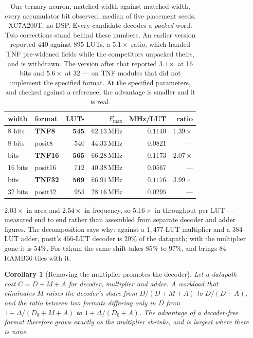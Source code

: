 \documentclass[11pt]{article}
\newtheorem{corollary}{Corollary}
\theoremstyle{definition}
\begin{document}
\begin{table}[t]\centering
\caption{One ternary neuron, matched width against matched width, every
accumulator bit observed, median of five placement seeds, XC7A200T, no DSP.
Every candidate decodes a \emph{packed} word. Two corrections stand behind these
numbers. An earlier version reported $440$ against $895$ LUTs, a $5.1\times$
ratio, which handed TNF pre-widened fields while the competitors unpacked
theirs, and is withdrawn. The version after that reported $3.1\times$ at 16 bits
and $5.6\times$ at 32 --- on TNF modules that did not implement the specified
format. At the specified parameters, and checked against a reference, the
advantage is smaller and it is real.}
\label{tab:tnet}
\begin{tabular}{llrrrr}
\toprule
width & format & LUTs & $F_{\max}$ & MHz/LUT & ratio \\
\midrule
8 bits & \textbf{TNF8} & $\mathbf{545}$ & $62.13$\,MHz & $\mathbf{0.1140}$ & $\mathbf{1.39\times}$ \\
8 bits & posit8 & $540$ & $44.33$\,MHz & $0.0821$ & --- \\
\addlinespace
16 bits & \textbf{TNF16} & $\mathbf{565}$ & $66.28$\,MHz & $\mathbf{0.1173}$ & $\mathbf{2.07\times}$ \\
16 bits & posit16 & $712$ & $40.38$\,MHz & $0.0567$ & --- \\
\addlinespace
32 bits & \textbf{TNF32} & $\mathbf{569}$ & $66.91$\,MHz & $\mathbf{0.1176}$ & $\mathbf{3.99\times}$ \\
32 bits & posit32 & $953$ & $28.16$\,MHz & $0.0295$ & --- \\
\bottomrule
\end{tabular}
\end{table}

$2.03\times$ in area and $2.54\times$ in frequency, so $5.16\times$ in throughput
per LUT --- measured end to end rather than assembled from separate decoder and
adder figures. The decomposition says why: against a $1{,}477$-LUT multiplier and
a $384$-LUT adder, posit's $456$-LUT decoder is $20\%$ of the datapath; with the
multiplier gone it is $54\%$. For takum the same shift takes $85\%$ to $97\%$, and
brings $84$ RAMB36 tiles with it.

\begin{corollary}[Removing the multiplier promotes the decoder]
\label{cor:promote}
Let a datapath cost $C = D + M + A$ for decoder, multiplier and adder. A workload
that eliminates $M$ raises the decoder's share from $D/(D{+}M{+}A)$ to
$D/(D{+}A)$, and the ratio between two formats differing only in $D$ from
$1 + \Delta/(D_0{+}M{+}A)$ to $1 + \Delta/(D_0{+}A)$. The advantage of a
decoder-free format therefore grows exactly as the multiplier shrinks, and is
largest where there is none.
\end{corollary}
\end{document}
